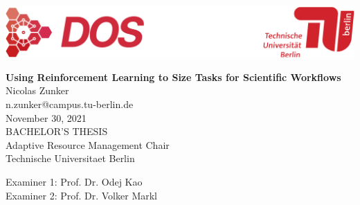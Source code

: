 
\thispagestyle{empty}

\includegraphics[width=\linewidth]{fig/Logo_Header}
\mbox{}\\[1pc]
\begin{center}
    \huge{ \bfseries Using Reinforcement Learning to Size Tasks for Scientific Workflows}\\[2pc]

    \Large{Nicolas Zunker}\\
    \large{n.zunker@campus.tu-berlin.de}\\[1pc]
    \large{November 30, 2021}\\[2pc]

    BACHELOR'S THESIS\\
    Adaptive Resource Management Chair\\
    Technische Universitaet Berlin
\end{center}
\vfill

Examiner 1: Prof. Dr. Odej Kao
\hfill{}\\
Examiner 2: Prof. Dr. Volker Markl

\afterpage{\null\thispagestyle{empty}\newpage}
